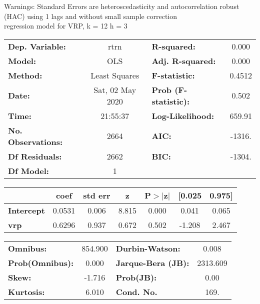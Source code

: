 Warnings: \newline
 [1] Standard Errors are heteroscedasticity and autocorrelation robust (HAC) using 1 lags and without small sample correction\\ 

regression model for VRP, k = 12 h = 3\begin{center}
\begin{tabular}{lclc}
\toprule
\textbf{Dep. Variable:}    &       rtrn       & \textbf{  R-squared:         } &     0.000   \\
\textbf{Model:}            &       OLS        & \textbf{  Adj. R-squared:    } &     0.000   \\
\textbf{Method:}           &  Least Squares   & \textbf{  F-statistic:       } &    0.4512   \\
\textbf{Date:}             & Sat, 02 May 2020 & \textbf{  Prob (F-statistic):} &    0.502    \\
\textbf{Time:}             &     21:55:37     & \textbf{  Log-Likelihood:    } &    659.91   \\
\textbf{No. Observations:} &        2664      & \textbf{  AIC:               } &    -1316.   \\
\textbf{Df Residuals:}     &        2662      & \textbf{  BIC:               } &    -1304.   \\
\textbf{Df Model:}         &           1      & \textbf{                     } &             \\
\bottomrule
\end{tabular}
\begin{tabular}{lcccccc}
                   & \textbf{coef} & \textbf{std err} & \textbf{z} & \textbf{P$> |$z$|$} & \textbf{[0.025} & \textbf{0.975]}  \\
\midrule
\textbf{Intercept} &       0.0531  &        0.006     &     8.815  &         0.000        &        0.041    &        0.065     \\
\textbf{vrp}       &       0.6296  &        0.937     &     0.672  &         0.502        &       -1.208    &        2.467     \\
\bottomrule
\end{tabular}
\begin{tabular}{lclc}
\textbf{Omnibus:}       & 854.900 & \textbf{  Durbin-Watson:     } &    0.008  \\
\textbf{Prob(Omnibus):} &   0.000 & \textbf{  Jarque-Bera (JB):  } & 2313.609  \\
\textbf{Skew:}          &  -1.716 & \textbf{  Prob(JB):          } &     0.00  \\
\textbf{Kurtosis:}      &   6.010 & \textbf{  Cond. No.          } &     169.  \\
\bottomrule
\end{tabular}
\end{center}

